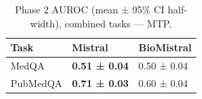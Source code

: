 \begin{table}
\caption{Phase 2 AUROC (mean ± 95\% CI half-width), combined tasks — MTP.}
\label{tab:phase2_auroc_all_mtp}
\begin{tabular}{lll}
\toprule
Task & Mistral & BioMistral \\
\midrule
MedQA & \textbf{0.51 ± 0.04} & 0.50 ± 0.04 \\
PubMedQA & \textbf{0.71 ± 0.03} & 0.60 ± 0.04 \\
\bottomrule
\end{tabular}
\end{table}
